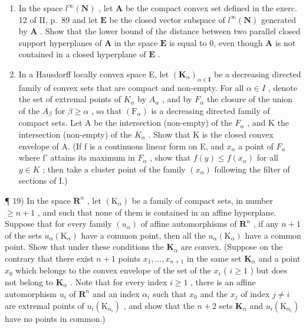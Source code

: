 \begin{enumerate}
\def\labelenumi{\arabic{enumi})}
\setcounter{enumi}{16}
\item
  In the space \(l^{\infty}(\mathbf{N})\) , let \(\mathbf{A}\) be the compact convex set defined in the exerc. 12 of II, p.~89 and let \(\mathbf{E}\) be the closed vector subspace of \(l^{\infty}(\mathbf{N})\) generated by \(\mathbf{A}\) . Show that the lower bound of the distance between two parallel closed support hyperplanes of \(\mathbf{A}\) in the space \(\mathbf{E}\) is equal to 0, even though \(\mathbf{A}\) is not contained in a closed hyperplane of \(\mathbf{E}\) .
\item
  In a Hausdorff locally convex space E, let \((\mathbf{K}_{\alpha})_{\alpha\in\mathbf{I}}\) be a decreasing directed family of convex sets that are compact and non-empty. For all \(\alpha\in I\) , denote the set of extremal points of \(K_{\alpha}\) by \(A_{\alpha}\) , and by \(F_{\alpha}\) the closure of the union of the \(A_{\beta}\) for \(\beta\geqslant\alpha\) , so that \((\mathrm{F}_{\alpha})\) is a decreasing directed family of compact sets. Let A be the intersection (non-empty) of the \(F_{\alpha}\) , and K the intersection (non-empty) of the \(K_{\alpha}\) . Show that K is the closed convex envelope of A. (If f is a continuous linear form on E, and \(x_{\alpha}\) a point of \(F_{\alpha}\) where f' attains its maximum in \(F_{\alpha}\) , show that \(f(y)\leqslant f(x_{\alpha})\) for all \(y\in K\) ; then take a cluster point of the family \((x_{\alpha})\) following the filter of sections of I.)
\end{enumerate}

¶ 19) In the space \(\mathbf{R}^n\) , let \((\mathrm{K}_{\alpha})\) be a family of compact sets, in number \(\geqslant n + 1\) , and such that none of them is contained in an affine hyperplane. Suppose that for every family \((u_{\alpha})\) of affine automorphisms of \(\mathbf{R}^n\) , if any \(n + 1\) of the sets \(u_{\alpha}(\mathrm{K}_{\alpha})\) have a common point, then all the \(u_{\alpha}(\mathrm{K}_{\alpha})\) have a common point. Show that under these conditions the \(\mathbf{K}_{\alpha}\) are convex. (Suppose on the contrary that there exist \(n + 1\) points \(x_1, \ldots, x_{n+1}\) in the same set \(\mathbf{K}_{\alpha}\) and a point \(x_0\) which belongs to the convex envelope of the set of the \(x_i\) ( \(i \geqslant 1\) ) but does not belong to \(\mathbf{K}_{\alpha}\) . Note that for every index \(i \geqslant 1\) , there is an affine automorphism \(u_i\) of \(\mathbf{R}^n\) and an index \(\alpha_i\) such that \(x_0\) and the \(x_j\) of index \(j \neq i\) are extremal points of \(u_i(\mathrm{K}_{\alpha_i})\) , and show that the \(n + 2\) sets \(\mathbf{K}_{\alpha}\) and \(u_i(\mathrm{K}_{\alpha_i})\) have no points in common.)

